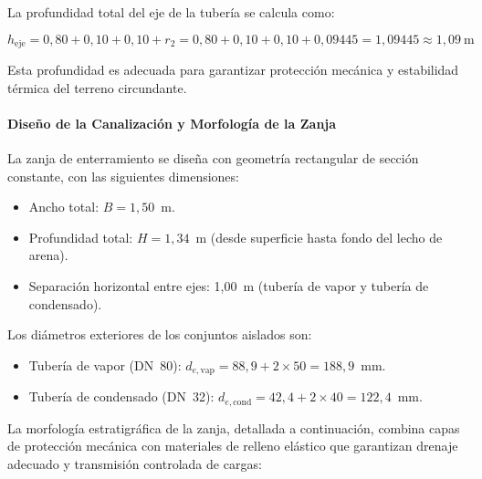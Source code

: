 \documentclass[12pt]{article}
\begin{document}
La profundidad total del eje de la tubería se calcula como:

\begin{equation}
	h_{\text{eje}} = 0{,}80 + 0{,}10 + 0{,}10 + r_2 = 0{,}80 + 0{,}10 + 0{,}10 + 0{,}09445 = 1{,}09445 \approx 1{,}09~\text{m}
	\label{eq:profundidad_eje}
\end{equation}

Esta profundidad es adecuada para garantizar protección mecánica y estabilidad térmica del terreno circundante.

\paragraph{Diseño de la Canalización y Morfología de la Zanja}
\label{par:diseno_canalizacion}

La zanja de enterramiento se diseña con geometría rectangular de sección constante, con las siguientes dimensiones:

\begin{itemize}[noitemsep]
	\item Ancho total: $B = 1{,}50$~m.
	\item Profundidad total: $H = 1{,}34$~m (desde superficie hasta fondo del lecho de arena).
	\item Separación horizontal entre ejes: 1{,}00~m (tubería de vapor y tubería de condensado).
\end{itemize}

Los diámetros exteriores de los conjuntos aislados son:

\begin{itemize}[noitemsep]
	\item Tubería de vapor (DN~80): $d_{e,\text{vap}} = 88{,}9 + 2 \times 50 = 188{,}9$~mm.
	\item Tubería de condensado (DN~32): $d_{e,\text{cond}} = 42{,}4 + 2 \times 40 = 122{,}4$~mm.
\end{itemize}

La morfología estratigráfica de la zanja, detallada a continuación, combina capas de protección mecánica con materiales de relleno elástico que garantizan drenaje adecuado y transmisión controlada de cargas:
\end{document}
